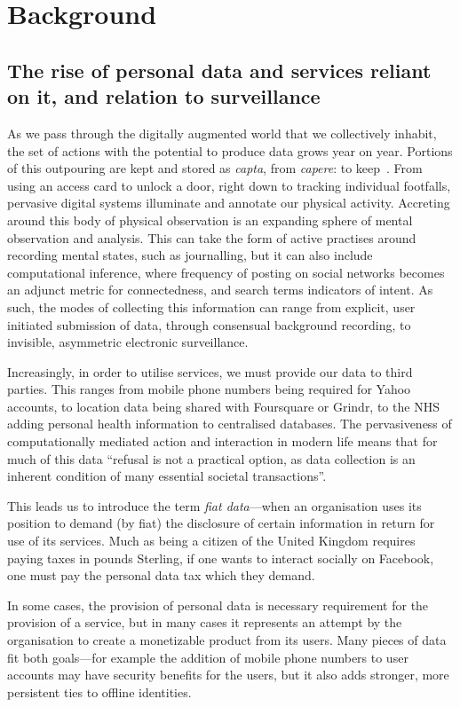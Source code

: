 \documentclass{IOS-Book-Article}     %
\begin{document}
\section{Background}

\subsection{The rise of personal data and services reliant on it, and relation
to surveillance}

As we pass through the digitally augmented world that we collectively inhabit,
the set of actions with the potential to produce data grows year on year.
Portions of this outpouring are kept and stored as
\emph{capta}, from \emph{capere}: to keep~\cite{dodge2005codes}. From
using an access card to unlock a door, right down to tracking
individual footfalls, pervasive digital systems illuminate and annotate our
physical activity. Accreting around this body of physical observation is an
expanding sphere of mental observation and analysis. This can take the form of
active practises around recording mental states, such as journalling, but it can
also include computational inference, where frequency of posting on social
networks becomes an adjunct metric for connectedness, and search terms 
indicators of intent. As such, the modes of collecting this information can
range from explicit, user initiated submission of data, through consensual
background recording, to invisible, asymmetric electronic surveillance.

Increasingly, in order to utilise services, we must provide our data to third
parties. This ranges from mobile phone numbers being required for Yahoo
accounts, to location data being shared with Foursquare or Grindr, to the NHS
adding personal health information to centralised databases. 
The pervasiveness of computationally mediated action and interaction in modern
life means that for much of this data ``refusal is not a practical option, as
data collection is an inherent condition of many essential societal
transactions''\cite{brunton2011vernacular}. 

This leads us to introduce the term 
\emph{fiat data}---when an
organisation uses its position to demand (by fiat) the disclosure of certain
information in return for use of its services. 
Much as being a citizen of the United Kingdom requires paying taxes in pounds
Sterling, if one wants to interact socially on Facebook, one must pay the
personal data tax which they demand. 

In some cases, the provision of personal data is
necessary requirement for the provision of a service, but in many
cases it represents an attempt by the organisation to create a monetizable product from
its users. Many pieces of data fit both goals---for example the addition of 
mobile phone numbers to user accounts may have security benefits for the users,
but it also adds stronger, more persistent ties to offline identities.
\end{document}
